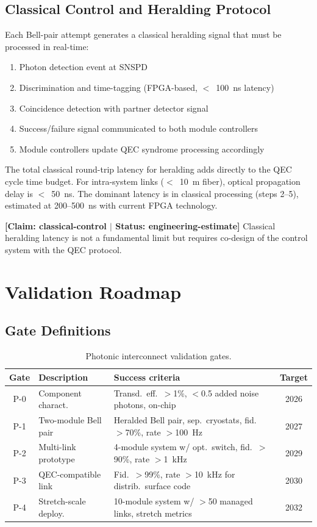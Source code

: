 \documentclass[conference]{IEEEtran}
\begin{document}
\subsection{Classical Control and Heralding Protocol}

Each Bell-pair attempt generates a classical heralding signal that must be processed in real-time:
\begin{enumerate}
\item Photon detection event at SNSPD
\item Discrimination and time-tagging (FPGA-based, $<$~100~ns latency)
\item Coincidence detection with partner detector signal
\item Success/failure signal communicated to both module controllers
\item Module controllers update QEC syndrome processing accordingly
\end{enumerate}

The total classical round-trip latency for heralding adds directly to the QEC cycle time budget. For intra-system links ($<$~10~m fiber), optical propagation delay is $<$~50~ns. The dominant latency is in classical processing (steps 2--5), estimated at 200--500~ns with current FPGA technology.

\textbf{[Claim: classical-control $|$ Status: engineering-estimate]} Classical heralding latency is not a fundamental limit but requires co-design of the control system with the QEC protocol.

\section{Validation Roadmap}

\subsection{Gate Definitions}

\begin{table}[H]
\centering
\caption{Photonic interconnect validation gates.}
\label{tab:validation-gates}
\footnotesize
\begin{tabularx}{\columnwidth}{cL{1.5cm}L{3.2cm}c}
\toprule
\textbf{Gate} & \textbf{Description} & \textbf{Success criteria} & \textbf{Target} \\
\midrule
P-0 & Component charact. & Transd.\ eff.\ $>$1\%, $<$0.5 added noise photons, on-chip & 2026 \\
P-1 & Two-module Bell pair & Heralded Bell pair, sep.\ cryostats, fid.\ $>$70\%, rate $>$100~Hz & 2027 \\
P-2 & Multi-link prototype & 4-module system w/ opt.\ switch, fid.\ $>$90\%, rate $>$1~kHz & 2029 \\
P-3 & QEC-compatible link & Fid.\ $>$99\%, rate $>$10~kHz for distrib.\ surface code & 2030 \\
P-4 & Stretch-scale deploy. & 10-module system w/ $>$50 managed links, stretch metrics & 2032 \\
\bottomrule
\end{tabularx}
\end{table}
\end{document}
